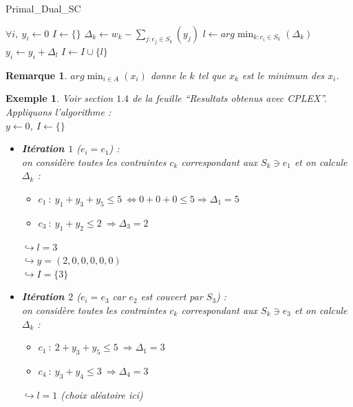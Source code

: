 \documentclass[12pt]{article}
\newtheorem{exemple}{Exemple}[section]
\newtheorem{rem}{Remarque}[section]
\begin{document}
\begin{algorithm}[H]
\caption{Primal\_Dual\_SC}
\begin{algorithmic}[1]
\STATE $\forall i,\ y_i \leftarrow 0$
\STATE $I\leftarrow \{\}$
\STATE $\Delta_k \leftarrow w_k - \sum_{j:e_j\in S_k}(y_j)$
\ENDFOR
\STATE $l \leftarrow arg\min_{k:e_i\in S_k}(\Delta_k)$
\STATE $y_i \leftarrow y_i+\Delta_l$
\STATE $I\leftarrow I\cup \{l\}$
\ENDWHILE
\end{algorithmic}
\end{algorithm}

\begin{rem}
$arg\min_{i\in A}(x_i)$ donne le $k$ tel que $x_k$ est le minimum des $x_i$.
\end{rem}

\begin{exemple}
Voir section $1.4$ de la feuille ``Resultats obtenus avec CPLEX''. Appliquons
l'algorithme : \\
\indent $y \leftarrow 0$, $I \leftarrow \{\}$
\begin{itemize}
\item \textbf{Itération $1$} ($e_i = e_1$) :\\
on considère toutes les contraintes $c_k$ correspondant aux $S_k \ni e_1$ et on
calcule $\Delta_k$ :
	\begin{itemize}
	\item $c_1\ :\ y_1+y_3+y_5 \leq 5\ \Leftrightarrow 0+0+0\leq 5 \Rightarrow
    \Delta_1 = 5$
	\item $c_3\ :\ y_1+y_2 \leq 2\ \Rightarrow \Delta_3 = 2$
	\end{itemize}
	$\hookrightarrow l = 3$ \\
	$\hookrightarrow y = (2,0,0,0,0,0)$\\
	$\hookrightarrow I = \{3\}$\\
\item \textbf{Itération $2$} ($e_i = e_3$ car $e_2$ est couvert par $S_3$) :\\
on considère toutes les contraintes $c_k$ correspondant aux $S_k \ni e_3$ et on
calcule $\Delta_k$ :
	\begin{itemize}
	\item $c_1\ :\ 2+y_3+y_5 \leq 5\ \Rightarrow \Delta_1 = 3$
	\item $c_4\ :\ y_3+y_4 \leq 3\ \Rightarrow \Delta_4 = 3$
	\end{itemize}
	$\hookrightarrow l = 1$ (choix aléatoire ici)\\

\end{itemize}
\end{exemple}
\end{document}
